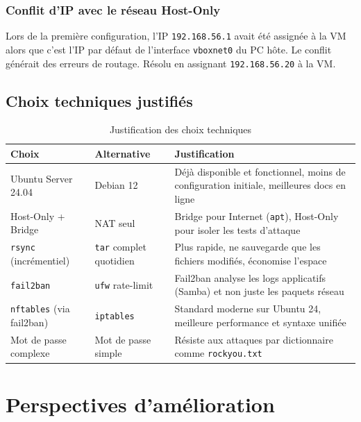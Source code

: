 \documentclass[12pt,a4paper]{article}
\begin{document}
\subsubsection{Conflit d'IP avec le réseau Host-Only}

Lors de la première configuration, l'IP \texttt{192.168.56.1} avait été assignée à la VM
alors que c'est l'IP par défaut de l'interface \texttt{vboxnet0} du PC hôte. Le conflit
générait des erreurs de routage. Résolu en assignant \texttt{192.168.56.20} à la VM.

\subsection{Choix techniques justifiés}

\begin{table}[H]
  \centering
  \begin{tabular}{p{3.8cm}p{3.8cm}p{5.5cm}}
    \toprule
    \textbf{Choix} & \textbf{Alternative} & \textbf{Justification} \\
    \midrule
    Ubuntu Server 24.04 & Debian 12 & Déjà disponible et fonctionnel, moins de configuration initiale, meilleures docs en ligne \\
    Host-Only + Bridge  & NAT seul  & Bridge pour Internet (\texttt{apt}), Host-Only pour isoler les tests d'attaque \\
    \texttt{rsync} (incrémentiel) & \texttt{tar} complet quotidien & Plus rapide, ne sauvegarde que les fichiers modifiés, économise l'espace \\
    \texttt{fail2ban} & \texttt{ufw} rate-limit & Fail2ban analyse les logs applicatifs (Samba) et non juste les paquets réseau \\
    \texttt{nftables} (via fail2ban) & \texttt{iptables} & Standard moderne sur Ubuntu 24, meilleure performance et syntaxe unifiée \\
    Mot de passe complexe & Mot de passe simple & Résiste aux attaques par dictionnaire comme \texttt{rockyou.txt} \\
    \bottomrule
  \end{tabular}
  \caption{Justification des choix techniques}
\end{table}

\section{Perspectives d'amélioration}
\end{document}
